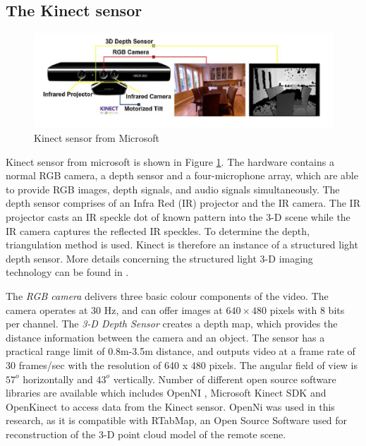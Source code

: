 \subsection{The Kinect sensor }
\begin{figure}
	\includegraphics[width=\linewidth,keepaspectratio]{Chapter7/fig/Kinect}
	\caption{Kinect sensor from Microsoft}	\label{fig:Kinect}
\end{figure}
Kinect sensor from microsoft is shown in Figure \ref{fig:Kinect}. The hardware contains a normal RGB camera, a depth sensor and a four-microphone array, which are able to provide  RGB images,  depth signals, and audio signals simultaneously. The depth sensor comprises of an Infra Red (IR) projector and the IR camera. The IR projector casts an IR speckle dot of known  pattern into the 3-D scene while the IR camera captures the reflected IR speckles. To determine the depth, triangulation method is used.  Kinect is therefore an instance of a structured light depth sensor. More details concerning the structured light 3-D imaging technology can be found in \cite{geng2011structured}. 

The \textit{RGB camera}  delivers three basic colour components of the video. The camera operates at 30 Hz, and can offer images at $640\times480$ pixels with 8 bits per channel. The  \textit{3-D Depth Sensor} creates a depth map, which provides the distance information between the camera and an object. The sensor has a practical range limit of 0.8m-3.5m distance, and outputs video at a frame rate of 30 frames/sec with the resolution of 640 x 480 pixels. The angular field of view is $57^o$ horizontally and $43^o$ vertically.
Number of different open source software libraries are available  which includes OpenNI \cite{openni}, Microsoft Kinect SDK  \cite{mssdk} and OpenKinect \cite{freenect} to access data from the Kinect sensor. OpenNi was used in this research, as it is compatible with RTabMap, an Open Source Software used for reconstruction of the 3-D point cloud model of the  remote scene. 

